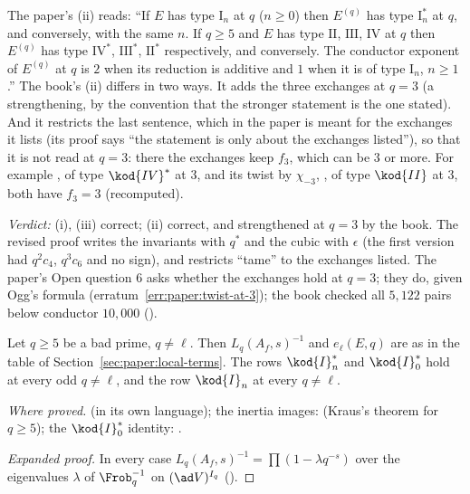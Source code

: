 \begin{sloppypar}
\begin{warning}\label{warn:paper:twist}
The paper's (ii) reads: ``If $E$ has type $\mathrm{I}_n$ at $q$ ($n\ge0$) then $E^{(q)}$ has type $\mathrm{I}_n^*$ at $q$, and conversely, with the same $n$. If $q\ge5$ and $E$ has type
$\mathrm{II}$, $\mathrm{III}$, $\mathrm{IV}$ at $q$ then $E^{(q)}$ has type $\mathrm{IV}^*$, $\mathrm{III}^*$, $\mathrm{II}^*$ respectively, and conversely. The conductor exponent of $E^{(q)}$ at $q$ is $2$ when its
reduction is additive and $1$ when it is of type $\mathrm{I}_n$, $n\ge1$.'' The book's (ii) differs in two ways. It adds the three exchanges at $q=3$ (a strengthening, by the
convention that the stronger statement is the one stated). And it restricts the last sentence, which in the paper is meant for the exchanges it lists (its proof says
``the statement is only about the exchanges listed''), so that it is not read at $q=3$: there the exchanges keep $f_3$, which can be $3$ or more. For example , of type
$\kod{IV}^*$ at $3$, and its twist by $\chi_{-3}$, , of type $\kod{II}$ at $3$, both have $f_3=3$ (recomputed).
\end{warning}

\noindent\emph{Verdict:} (i), (iii) correct; (ii) correct, and strengthened at $q=3$ by the book. The revised proof writes the invariants with $q^*$ and the cubic
with $\epsilon$ (the first version had $q^2c_4$, $q^3c_6$ and no sign), and restricts ``tame'' to the exchanges listed. The paper's Open question 6 asks
whether the exchanges hold at $q=3$; they do, given Ogg's formula (erratum~\ref{err:paper:twist-at-3}); the book checked all $5{,}122$ pairs below conductor
$10{,}000$ ().

\begin{lemma}\label{lem:paper:euler}
Let $q\ge5$ be a bad prime, $q\ne\ell$. Then $L_q(A_f,s)^{-1}$ and $e_\ell(E,q)$ are as in the table of Section~\ref{sec:paper:local-terms}. The rows $\kod{I}_n^*$ and $\kod{I}_0^*$ hold at every
odd $q\ne\ell$, and the row $\kod{I}_n$ at every $q\ne\ell$.
\end{lemma}

\noindent\emph{Where proved.}  (in its own language); the inertia images:  (Kraus's theorem \cite{Kraus90} for $q\ge5$); the $\kod{I}_0^*$ identity:
.

\begin{proof}[Expanded proof]
In every case $L_q(A_f,s)^{-1}=\prod(1-\lambda q^{-s})$ over the eigenvalues $\lambda$ of $\Frob_q^{-1}$ on $(\ad V)^{I_q}$ ().


\end{proof}
\end{sloppypar}

